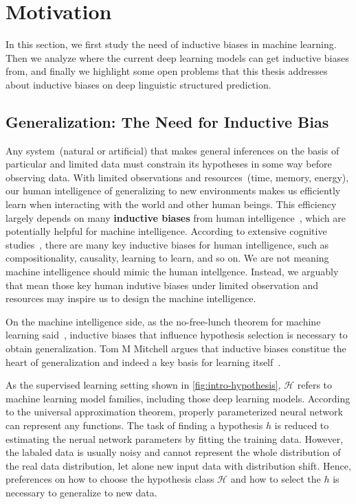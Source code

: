 \section{Motivation}
\label{sec:intro:motivation}

In this section, we first study the need of inductive biases in
machine learning. Then we analyze where the current deep learning
models can get inductive biases from, and finally we highlight some
open problems that this thesis addresses about inductive biases on
deep linguistic structured prediction.

\subsection{Generalization: The Need for Inductive Bias}
\label{ssec:intro:need-of-bias}

Any system~(natural or artificial) that makes general inferences on
the basis of particular and limited data must constrain its hypotheses
in some way before observing data. With limited observations and
resources~(time, memory, energy), our human intelligence of
generalizing to new environments makes us efficiently learn when
interacting with the world and other human beings. This efficiency
largely depends on many {\bf inductive biases} from human
intelligence~\citep{Gershman2021WhatMU}, which are potentially helpful
for machine intelligence. According to extensive cognitive
studies~\citep{Spelke1990PrinciplesOO,Bienenstock1996CompositionalityMP,Rehder2003ACT,harlow1949formation,
  Lake2016BuildingMT,Gershman2021WhatMU}, there are many key inductive
biases for human intelligence, such as compositionality, causality,
learning to learn, and so on. We are not meaning machine intelligence
should mimic the human intellgence. Instead, we arguably that mean
those key human indutive biases under limited observation and
resources may inspire us to design the machine intelligence.

On the machine intelligence side, as the no-free-lunch theorem for
machine learning said~\citep{baxter2000model,wolpert1995no}, inductive
biases that influence hypothesis selection is necessary to obtain
generalization. Tom M Mitchell argues that
inductive biases constitue the heart of generalization and indeed a
key basis for learning itself~\citep{mitchell1980need}.

As the supervised learning setting shown in
\autoref{fig:intro-hypothesis}, $\mathcal{H}$ refers to machine
learning model families, including those deep learning models.
According to the universal approximation theorem, properly
parameterized neural network can represent any functions. The task of
finding a hypothesis $h$ is reduced to estimating the nerual network
parameters by fitting the training data. However, the labaled data is
usually noisy and cannot represent the whole distribution of the real
data distribution, let alone new input data with distribution shift.
Hence, preferences on how to choose the hypothesis class
$\mathcal{H}$ and how to select the $h$ is necessary to generalize to
new data.

